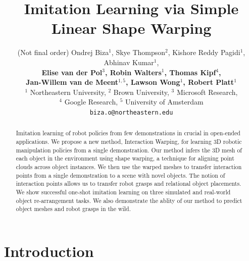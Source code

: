 \documentclass{article}
\title{Imitation Learning via Simple Linear Shape Warping}
\author{
  (Not final order) Ondrej Biza$^1$, Skye Thompson$^2$, Kishore Reddy Pagidi$^1$, Abhinav Kumar$^1$, \\
  \textbf{Elise van der Pol$^3$, Robin Walters$^1$, Thomas Kipf$^4$,} \\
  \textbf{Jan-Willem van de Meent$^{1,5}$, Lawson Wong$^1$, Robert Platt$^1$} \\
  $^1$ Northeastern University, $^2$ Brown University, $^3$ Microsoft Research, \\$^4$ Google Research, $^5$ University of Amsterdam \\
  \texttt{biza.o@northeastern.edu} \\
}
\newcommand{\ob}[1]{\textcolor{purple}{[\textbf{OB:} #1]}}
\begin{document}
\maketitle


\begin{abstract}
Imitation learning of robot policies from few demonstrations in crucial in open-ended applications. We propose a new method, Interaction Warping, for learning 3D robotic manipulation policies from a single demonstration. Our method infers the 3D mesh of each object in the environment using shape warping, a technique for aligning point clouds across object instances. We then use the warped meshes to transfer interaction points from a single demonstration to a scene with novel objects. The notion of interaction points allows us to transfer robot grasps and relational object placements. We show successful one-shot imitation learning on three simulated and real-world object re-arrangement tasks. We also demonstrate the ablity of our method to predict object meshes and robot grasps in the wild.
\end{abstract}




\section{Introduction}
\end{document}
